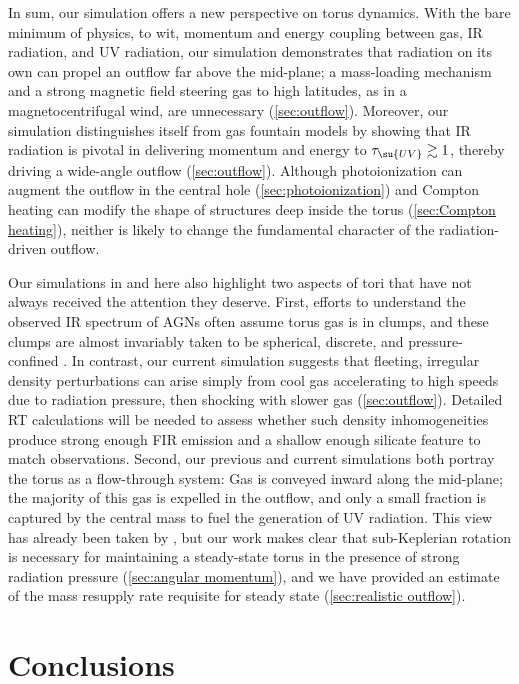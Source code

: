 \documentclass[twocolumn]{article}
\begin{document}
In sum, our simulation offers a new perspective on torus dynamics. With the
bare minimum of physics, to wit, momentum and energy coupling between gas,
\ac{IR} radiation, and \ac{UV} radiation, our simulation demonstrates that
radiation on its own can propel an outflow far above the mid-plane; a
mass-loading mechanism and a strong magnetic field steering gas to high
latitudes, as in a magnetocentrifugal wind, are unnecessary
(\cref{sec:outflow}). Moreover, our simulation distinguishes itself from gas
fountain models by showing that \ac{IR} radiation is pivotal in delivering
momentum and energy to $\tau_\su{UV}\gtrsim1$, thereby driving a wide-angle
outflow (\cref{sec:outflow}). Although photoionization can augment the outflow
in the central hole (\cref{sec:photoionization}) and Compton heating can modify
the shape of structures deep inside the torus (\cref{sec:Compton heating}),
neither is likely to change the fundamental character of the radiation-driven
outflow.

Our simulations in  and here also highlight two
aspects of tori that have not always received the attention they deserve.
First, efforts to understand the observed \ac{IR} spectrum of \acp{AGN} often
assume torus gas is in clumps, and these clumps are almost invariably taken to
be spherical, discrete, and pressure-confined
\citep[e.g.,][]{2006ApJ...648L.101E}. In contrast, our current simulation
suggests that fleeting, irregular density perturbations can arise simply from
cool gas accelerating to high speeds due to radiation pressure, then shocking
with slower gas (\cref{sec:outflow}). Detailed \ac{RT} calculations will be
needed to assess whether such density inhomogeneities produce strong enough
\ac{FIR} emission and a shallow enough silicate feature to match observations.
Second, our previous and current simulations both portray the torus as a
flow-through system: Gas is conveyed inward along the mid-plane; the majority
of this gas is expelled in the outflow, and only a small fraction is captured
by the central mass to fuel the generation of \ac{UV} radiation. This view has
already been taken by \citet{1988ApJ...329..702K}, but our work makes clear
that sub-Keplerian rotation is necessary for maintaining a steady-state torus
in the presence of strong radiation pressure (\cref{sec:angular momentum}), and
we have provided an estimate of the mass resupply rate requisite for steady
state (\cref{sec:realistic outflow}).

\section{Conclusions}
\end{document}
